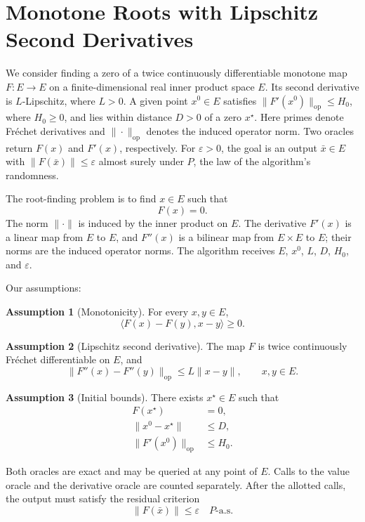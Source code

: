 \documentclass[10pt]{article}
\theoremstyle{definition}
\newtheorem{assumption}{Assumption}
\begin{document}
\section*{Monotone Roots with Lipschitz Second Derivatives}
We consider finding a zero of a twice continuously differentiable monotone map $F:E\to E$ on a finite-dimensional real inner product space $E$. Its second derivative is $L$-Lipschitz, where $L>0$. A given point $x^0\in E$ satisfies $\|F'(x^0)\|_{\mathrm{op}}\leq H_0$, where $H_0\geq0$, and lies within distance $D>0$ of a zero $x^\star$. Here primes denote Fr\'echet derivatives and $\|\cdot\|_{\mathrm{op}}$ denotes the induced operator norm. Two oracles return $F(x)$ and $F'(x)$, respectively. For $\varepsilon>0$, the goal is an output $\bar{x}\in E$ with $\|F(\bar{x})\|\leq\varepsilon$ almost surely under $P$, the law of the algorithm's randomness.

The root-finding problem is to find $x\in E$ such that
\[
F(x)=0.
\]
The norm $\|\cdot\|$ is induced by the inner product on $E$. The derivative $F'(x)$ is a linear map from $E$ to $E$, and $F''(x)$ is a bilinear map from $E\times E$ to $E$; their norms are the induced operator norms. The algorithm receives $E$, $x^0$, $L$, $D$, $H_0$, and $\varepsilon$.

Our assumptions:
\begin{assumption}[Monotonicity]
For every $x,y\in E$,
\[
\langle F(x)-F(y),x-y\rangle\geq0.
\]
\end{assumption}

\begin{assumption}[Lipschitz second derivative]
The map $F$ is twice continuously Fr\'echet differentiable on $E$, and
\[
\|F''(x)-F''(y)\|_{\mathrm{op}}
\leq L\|x-y\|,
\qquad x,y\in E.
\]
\end{assumption}

\begin{assumption}[Initial bounds]
There exists $x^\star\in E$ such that
\[
\begin{aligned}
F(x^\star)&=0,\\
\|x^0-x^\star\|&\leq D,\\
\|F'(x^0)\|_{\mathrm{op}}&\leq H_0.
\end{aligned}
\]
\end{assumption}

Both oracles are exact and may be queried at any point of $E$. Calls to the value oracle and the derivative oracle are counted separately. After the allotted calls, the output must satisfy the residual criterion
\[
\|F(\bar{x})\|\leq\varepsilon
\quad P\text{-a.s.}
\]
\end{document}
